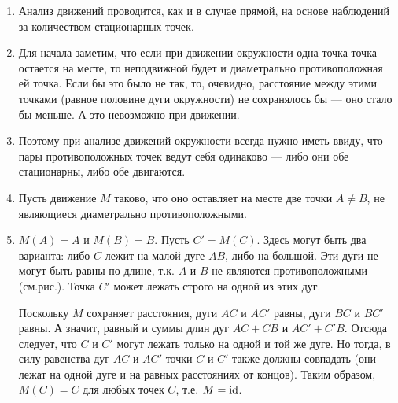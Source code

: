 \begin{enumerate}
\item Анализ движений проводится, как и в случае прямой, на основе наблюдений за количеством стационарных точек.
\item Для начала заметим, что если при движении окружности одна точка точка остается на месте, то неподвижной будет и диаметрально противоположная ей точка. Если бы это было не так, то, очевидно, расстояние между этими точками (равное половине дуги окружности) не сохранялось бы --- оно стало бы меньше. А это невозможно при движении.
\item Поэтому при анализе движений окружности всегда нужно иметь ввиду, что пары противоположных точек ведут себя одинаково --- либо они обе стационарны, либо обе двигаются.
\item Пусть движение $M$ таково, что оно оставляет на месте две точки $A\ne B$, не являющиеся диаметрально противоположными.
\item $M(A)=A$ и $M(B)=B$. Пусть $C'=M(C)$. Здесь могут быть два варианта: либо $C$ лежит на малой дуге $AB$, либо на большой. Эти дуги не могут быть равны по длине, т.к. $A$ и $B$ не являются противоположными (см.рис.). Точка $C'$ может лежать строго на одной из этих дуг.

Поскольку $M$ сохраняет расстояния, дуги $AC$ и $AC'$ равны, дуги $BC$ и $BC'$ равны. А значит, равный и суммы длин дуг $AC+CB$ и $AC'+C'B$. Отсюда следует, что $C$ и $C'$ могут лежать только на одной и той же дуге. Но тогда, в силу равенства дуг $AC$ и $AC'$ точки $C$ и $C'$ также должны совпадать (они лежат на одной дуге и на равных расстояниях от концов). Таким образом, $M(C)=C$ для любых точек $C$, т.е. $M=\mathrm{id}$.


\end{enumerate}
